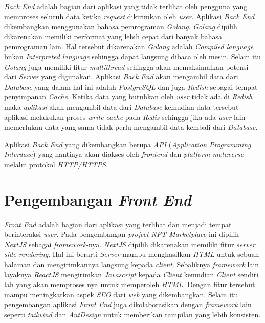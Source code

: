 \emph{Back End} adalah bagian dari aplikasi yang tidak terlihat oleh pengguna yang memproses seluruh data ketika \emph{request} dikirimkan oleh \emph{user}. Aplikasi \emph{Back End} dikembangkan menggunakan bahasa pemrograman \emph{Golang}. \emph{Golang} dipilih dikarenakan memiliki performat yang lebih cepat dari banyak bahasa pemrograman lain. Hal tersebut dikarenakan \emph{Golang} adalah \emph{Compiled language} bukan \emph{Interpreted language} sehingga dapat langsung dibaca oleh mesin. Selain itu \emph{Golang} juga memiliki fitur \emph{multithread} sehingga akan memaksimalkan potensi dari \emph{Server} yang digunakan. Aplikasi \emph{Back End} akan mengambil data dari \emph{Database} yang dalam hal ini adalah \emph{PostgreSQL} dan juga \emph{Redish} sebagai tempat penyimpanan \emph{Cache}. Ketika data yang butuhkan oleh \emph{user} tidak ada di \emph{Redish} maka \emph{aplikasi} akan mengambil data dari \emph{Database} kemudian data tersebut aplikasi melakukan proses \emph{write} \emph{cache} pada \emph{Redis} sehingga jika ada \emph{user} lain memerlukan data yang sama tidak perlu mengambil data kembali dari \emph{Database}.

Aplikasi \emph{Back End} yang dikembangkan berupa \emph{API} (\emph{Application Programming Interdace}) yang nantinya akan diakses oleh \emph{frontend} dan \emph{platform metaverse} melalui protokol \emph{HTTP/HTTPS}. 

\section{Pengembangan \emph{Front End}} 

\emph{Front End} adalah bagian dari aplikasi yang terlihat dan menjadi tempat berinteraksi \emph{user}. Pada pengembangan \emph{project} \emph{NFT Marketplace} ini dipilih \emph{NextJS} sebagai \emph{framework}-nya. \emph{NextJS} dipilih dikarenakan memiliki fitur \emph{server side rendering}. Hal ini berarti \emph{Server} mampu menghasilkan \emph{HTML} untuk sebuah halaman dan mengirimkannya langsung kepada \emph{client}. Sebaliknya \emph{framework} lain layaknya \emph{ReactJS} mengirimkan \emph{Javascript} kepada \emph{Client} kemudian \emph{Client} sendiri lah yang akan memproses nya untuk memperoleh \emph{HTML}. Dengan fitur tersebut mampu meningkatkan aspek \emph{SEO} dari \emph{web} yang dikembangkan. Selain itu pengembangan aplikasi \emph{Front End} juga dikolaborasikan dengan \emph{framework} lain seperti \emph{tailwind} dan \emph{AntDesign} untuk memberikan tampilan yang lebih konsisten.  

